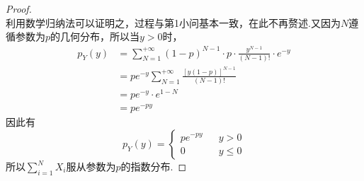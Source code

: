 \documentclass[twocolumn]{article}
\begin{document}
\begin{CJK}{UTF8}{gbsn}
\begin{enumerate}[a)]
\begin{proof}
\begin{equation*}
					\end{equation*}
					利用数学归纳法可以证明之，过程与第1小问基本一致，在此不再赘述.又因为$N$遵循参数为$p$的几何分布，所以当$y>0$时，\begin{align*}
						p_Y(y) & =\sum_{N=1}^{+\infty}(1-p)^{N-1}\cdot p\cdot\frac{y^{N-1}}{(N-1)!}\cdot e^{-y}\\
						& = pe^{-y}\sum_{N=1}^{+\infty}\frac{[y(1-p)]^{N-1}}{(N-1)!}\\
						& = pe^{-y}\cdot e^{1-N}\\
						& = pe^{-py}
					\end{align*}
					因此有\begin{equation*}
					p_Y(y)=\left\{
					\begin{array}{rcl}
					pe^{-py} & & {y>0}\\
					0 & & {y\le0}
					\end{array} \right.
					\end{equation*}
					所以$\sum_{i=1}^{N}X_i$服从参数为$p$的指数分布.
				\end{proof}
				\end{enumerate}
			
	\end{CJK}
\end{document}

